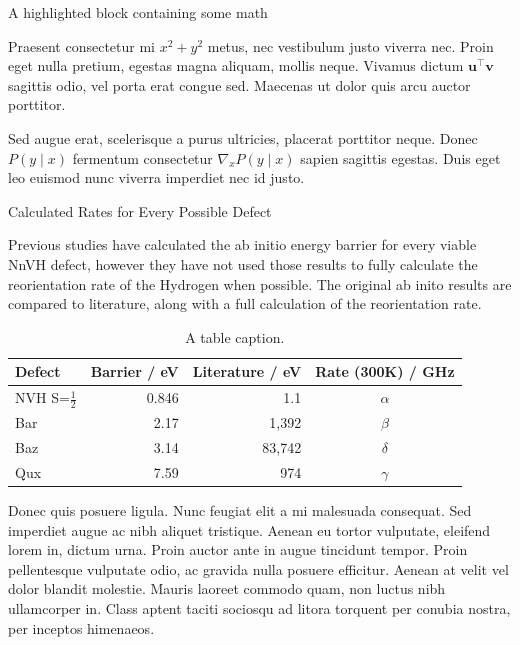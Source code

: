 \documentclass[final]{beamer}
\newlength{\colwidth}
\begin{document}
\begin{frame}[t]
\begin{columns}[t]
\begin{column}{\colwidth}
\begin{exampleblock}{A highlighted block containing some math}

    Praesent consectetur mi $x^2 + y^2$ metus, nec vestibulum justo viverra
    nec. Proin eget nulla pretium, egestas magna aliquam, mollis neque. Vivamus
    dictum $\mathbf{u}^\intercal\mathbf{v}$ sagittis odio, vel porta erat
    congue sed. Maecenas ut dolor quis arcu auctor porttitor.


    Sed augue erat, scelerisque a purus ultricies, placerat porttitor neque.
    Donec $P(y \mid x)$ fermentum consectetur $\nabla_x P(y \mid x)$ sapien
    sagittis egestas. Duis eget leo euismod nunc viverra imperdiet nec id
    justo.

  \end{exampleblock}

  \begin{block}{Calculated Rates for Every Possible Defect}

    Previous studies have calculated the ab initio energy barrier for every viable NnVH defect, however they have not used those results to fully calculate the reorientation rate of the Hydrogen when possible. The original ab inito results are compared to literature, along with a full calculation of the reorientation rate.

    \begin{table}
      \centering
      \begin{tabular}{l r r c}
        \toprule
        \textbf{Defect} & \textbf{Barrier / eV} & \textbf{Literature / eV} & \textbf{Rate (300K) / GHz} \\
        \midrule
        NVH S=$\frac{1}{2}$ & 0.846 & 1.1 & $\alpha$ \\
        Bar & 2.17 & 1,392 & $\beta$ \\
        Baz & 3.14 & 83,742 & $\delta$ \\
        Qux & 7.59 & 974 & $\gamma$ \\
        \bottomrule
      \end{tabular}
      \caption{A table caption.}
    \end{table}

    Donec quis posuere ligula. Nunc feugiat elit a mi malesuada consequat. Sed
    imperdiet augue ac nibh aliquet tristique. Aenean eu tortor vulputate,
    eleifend lorem in, dictum urna. Proin auctor ante in augue tincidunt
    tempor. Proin pellentesque vulputate odio, ac gravida nulla posuere
    efficitur. Aenean at velit vel dolor blandit molestie. Mauris laoreet
    commodo quam, non luctus nibh ullamcorper in. Class aptent taciti sociosqu
    ad litora torquent per conubia nostra, per inceptos himenaeos.


\end{block}
\end{column}
\end{columns}
\end{frame}
\end{document}
